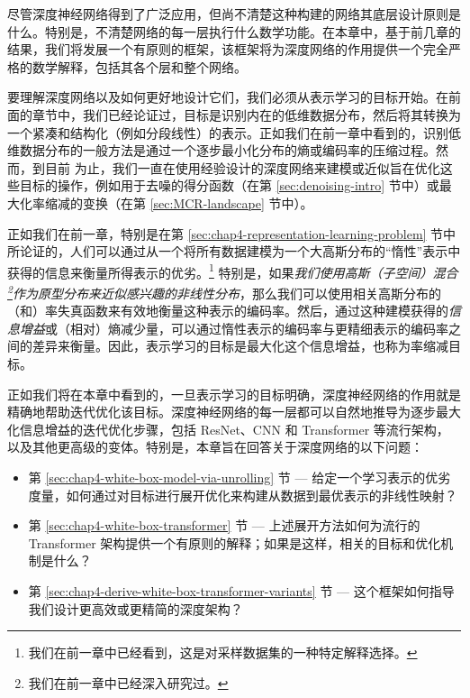 \documentclass[../../book-main_zh.tex]{subfiles}
\begin{document}
尽管深度神经网络得到了广泛应用，但尚不清楚这种构建的网络其底层设计原则是什么。特别是，不清楚网络的每一层执行什么数学功能。在本章中，基于前几章的结果，我们将发展一个有原则的框架，该框架将为深度网络的作用提供一个完全严格的数学解释，包括其各个层和整个网络。

要理解深度网络以及如何更好地设计它们，我们必须从表示学习的目标开始。在前面的章节中，我们已经论证过，目标是识别内在的低维数据分布，然后将其转换为一个紧凑和结构化（例如分段线性）的表示。正如我们在前一章中看到的，识别低维数据分布的一般方法是通过一个逐步最小化分布的熵或编码率的压缩过程。然而，到目前
为止，我们一直在使用经验设计的深度网络来建模或近似旨在优化这些目标的操作，例如用于去噪的得分函数（在第 \ref{sec:denoising-intro} 节中）或最大化率缩减的变换（在第 \ref{sec:MCR-landscape} 节中）。

正如我们在前一章，特别是在第 \ref{sec:chap4-representation-learning-problem} 节中所论证的，人们可以通过从一个将所有数据建模为一个大高斯分布的“惰性”表示中获得的信息来衡量所得表示的优劣。\footnote{我们在前一章中已经看到，这是对采样数据集的一种特定解释选择。} 特别是，如果\textit{我们使用高斯（子空间）混合\footnote{我们在前一章中已经深入研究过。}作为原型分布来近似感兴趣的非线性分布}，那么我们可以使用相关高斯分布的（和）率失真函数来有效地衡量这种表示的编码率。然后，通过这种建模获得的{\em 信息增益}或（相对）熵减少量，可以通过惰性表示的编码率与更精细表示的编码率之间的差异来衡量。因此，表示学习的目标是最大化这个信息增益，也称为率缩减目标。

正如我们将在本章中看到的，一旦表示学习的目标明确，深度神经网络的作用就是精确地帮助迭代优化该目标。深度神经网络的每一层都可以自然地推导为逐步最大化信息增益的迭代优化步骤，包括 ResNet、CNN 和 Transformer 等流行架构，以及其他更高级的变体。特别是，本章旨在回答关于深度网络的以下问题：
\begin{itemize}
    \item 第 \ref{sec:chap4-white-box-model-via-unrolling} 节 --- 给定一个学习表示的优劣度量，如何通过对目标进行展开优化来构建从数据到最优表示的非线性映射？
    \item 第 \ref{sec:chap4-white-box-transformer} 节 --- 上述展开方法如何为流行的 Transformer 架构提供一个有原则的解释；如果是这样，相关的目标和优化机制是什么？
    \item 第 \ref{sec:chap4-derive-white-box-transformer-variants} 节 --- 这个框架如何指导我们设计更高效或更精简的深度架构？
\end{itemize}
\end{document}
